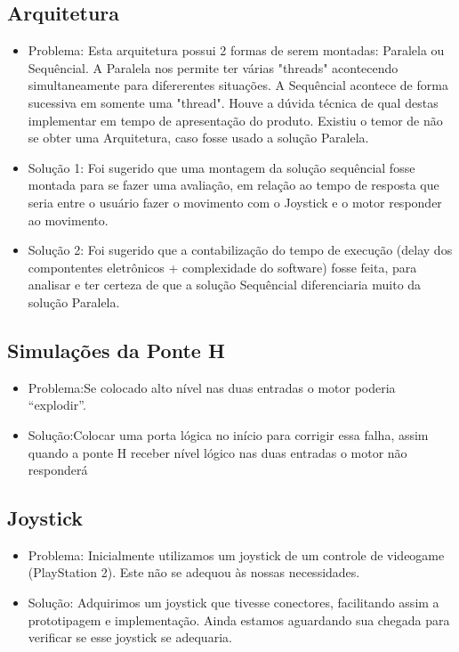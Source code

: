 \subsection{Arquitetura}
 \begin{itemize}
      \item Problema: Esta arquitetura possui 2 formas de serem montadas: Paralela ou Sequêncial. A Paralela nos permite ter várias "threads" acontecendo simultaneamente para difererentes situações. A Sequêncial acontece de forma sucessiva em somente uma  "thread". Houve a dúvida técnica de qual destas implementar em tempo de apresentação do produto. Existiu o temor de não se obter uma Arquitetura, caso fosse usado a solução Paralela.

	  \item Solução 1: Foi sugerido que uma montagem da solução sequêncial fosse montada para se fazer uma avaliação, em relação ao tempo de resposta que seria entre o usuário fazer o movimento com o Joystick e o motor responder ao movimento.
  \item Solução 2: Foi sugerido que a contabilização do tempo de execução (delay dos compontentes eletrônicos + complexidade do software) fosse feita, para analisar e ter certeza de que a solução Sequêncial diferenciaria muito da solução Paralela.

    \end{itemize}

\subsection{Simulações da Ponte H}
 \begin{itemize}
      \item Problema:Se colocado alto nível nas duas entradas o motor poderia “explodir”.

	  \item Solução:Colocar uma porta lógica no início para corrigir essa falha, assim quando a ponte H receber nível lógico nas duas entradas o motor não responderá

    \end{itemize}

\subsection{Joystick}
 \begin{itemize}
  \item Problema: Inicialmente utilizamos um joystick de um controle de videogame (PlayStation 2). Este não se adequou às nossas necessidades.
  \item Solução: Adquirimos um joystick que tivesse conectores, facilitando assim a prototipagem e implementação. Ainda estamos aguardando sua chegada para verificar se esse joystick se adequaria.

 \end{itemize}

